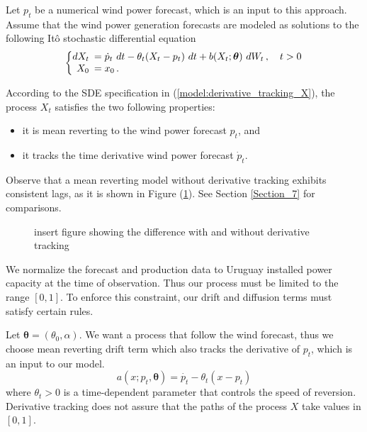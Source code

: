 \documentclass[11pt]{article}
\begin{document}
Let $p_t$ be a numerical wind power forecast, which is an input to this approach. Assume that the wind power generation forecasts are modeled as solutions to the following It\^{o} stochastic differential equation
\begin{equation}
  \left\{
  \begin{array}{@{}rl@{}}
    dX_t \!\!\!&= \dot{p}_t \ dt - \theta_t (X_t - p_t) \ dt + b (X_t; \bm{\theta} ) \ dW_t\,, \quad t > 0  \\
   X_0  \!\!\!&=  x_0 \,.
 \end{array}\right.  \label{model:derivative_tracking_X}
\end{equation} 

According to the SDE specification in (\ref{model:derivative_tracking_X}), the process $X_t$ satisfies the two following properties: \begin{itemize}
\item it is mean reverting to the wind power forecast $p_t$, and 
\item it tracks the time derivative wind power forecast $\dot{p}_t$.  
\end{itemize} 
Observe that a mean reverting model without derivative tracking exhibits consistent lags, as it is shown in Figure (\ref{fig:derivative_tracking}). See Section \ref{Section_7} for comparisons.

\begin{figure}
  \caption{insert figure showing the difference with and without derivative tracking}
  \label{fig:derivative_tracking}
\end{figure}


We normalize the forecast and production data to Uruguay installed power capacity at the time of observation. Thus our process must be limited to the range $[0,1]$. To enforce this constraint, our  drift and diffusion terms  must satisfy certain rules.
 

Let $\bm{\theta} = (\theta_0,\alpha)$. We want a process that follow the wind forecast, thus we choose mean reverting drift term which also tracks the derivative of $p_t$, which is an input to our model.
  \begin{equation}
    a(x; p_t,\bm{\theta})=  \dot{p_t} - \theta_t(x - p_t)
  \end{equation}
where $\theta_t>0$ is a time-dependent parameter that controls the speed of reversion. {\color{red} Derivative tracking does not assure that the paths of the process $X$ take values in $[0,1]$.}
\end{document}
